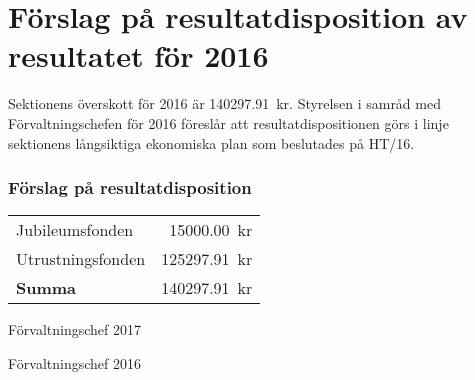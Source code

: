 \documentclass[../_main/handlingar.tex]{subfiles}
\begin{document}
\section{Förslag på resultatdisposition av resultatet för 2016}

Sektionens överskott för 2016 är \SI{140297.91}{kr}. Styrelsen i samråd med Förvaltningschefen för 2016 föreslår att resultatdispositionen görs i linje sektionens långsiktiga ekonomiska plan som beslutades på HT/16.

\subsubsection*{Förslag på resultatdisposition}
\begin{tabular}{l r}
    Jubileumsfonden & \SI{15000.00}{kr} \\
    Utrustningsfonden & \SI{125297.91}{kr} \\
    \hline
    \textbf{Summa} & \SI{140297.91}{kr} \\
\end{tabular}

\begin{signatures}{2}
    \ist
    \signature{Sophia Grimmeiss Grahm}{Förvaltningschef 2017}
    \signature{Anders Nilsson}{Förvaltningschef 2016}
\end{signatures}
\end{document}
